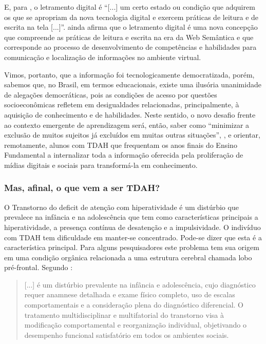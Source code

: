 \documentclass{textolivre}
\begin{document}
E, para \textcite[p. 151]{soares_praticas_2002}, o letramento digital é “[...] um certo estado ou condição que adquirem os que se apropriam da nova tecnologia digital e exercem práticas de leitura e de escrita na tela [...]”. \textcite{soares_praticas_2002} ainda afirma que o letramento digital é uma nova concepção que compreende as práticas de leitura e escrita na era da Web Semântica e que corresponde ao processo de desenvolvimento de competências e habilidades para comunicação e localização de informações no ambiente virtual. 

Vimos, portanto, que a informação foi tecnologicamente democratizada, porém, sabemos que, no Brasil, em termos educacionais, existe uma ilusória unanimidade de alegações democráticas, pois as condições de acesso por questões socioeconômicas refletem em desigualdades relacionadas, principalmente, à aquisição de conhecimento e de habilidades. Neste sentido, o novo desafio frente ao contexto emergente de aprendizagem será, então, saber como “minimizar a exclusão de muitos sujeitos já excluídos em muitas outras situações”, \textcite[p. 27]{coscarelli_letramento_2007}, e orientar, remotamente, alunos com TDAH que frequentam os anos finais do Ensino Fundamental a internalizar toda a informação oferecida pela proliferação de mídias digitais e sociais para transformá-la em conhecimento. 

\subsubsection{Mas, afinal, o que vem a ser TDAH?}\label{sec-TDAH}
O Transtorno do deficit de atenção com hiperatividade é um distúrbio que prevalece na infância e na adolescência que tem como características principais a hiperatividade, a presença contínua de desatenção e a impulsividade. O indivíduo com TDAH tem dificuldade em manter-se concentrado. Pode-se dizer que esta é a característica principal. Para alguns pesquisadores este problema tem sua origem em uma condição orgânica relacionada a uma estrutura cerebral chamada lobo pré-frontal. Segundo \textcite[p. 64]{andrade_transtorno_2018}:

\begin{quote}
    [...] é um distúrbio prevalente na infância e adolescência, cujo diagnóstico requer anamnese detalhada e exame físico completo, uso de escalas comportamentais e a consideração plena do diagnóstico diferencial. O tratamento multidisciplinar e multifatorial do transtorno visa à modificação comportamental e reorganização individual, objetivando o desempenho funcional satisfatório em todos os ambientes sociais.
\end{quote}
\end{document}
